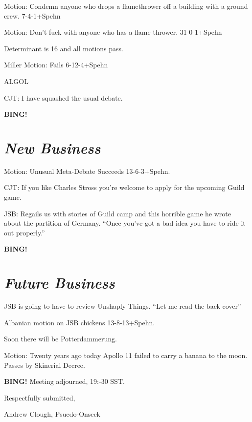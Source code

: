 \documentclass[10pt]{article}
\newcommand{\bing}{{\bf BING!} }
\newcommand{\goto}[1]{\bing \vskip 12pt \section*{{\em{#1}}}}
\begin{document}
Motion: Condemn anyone who drops a flamethrower off a building with a ground crew.  7-4-1+Spehn

Motion:  Don't fuck with anyone who has a flame thrower.  31-0-1+Spehn

Determinant is 16 and all motions pass.

Miller Motion: Fails  6-12-4+Spehn

ALGOL

CJT:  I have squashed the usual debate.

\goto{New Business}

Motion:  Unusual Meta-Debate  Succeeds 13-6-3+Spehn.

CJT:  If you like Charles Stross you're welcome to apply for the upcoming Guild game.

JSB:  Regails us with stories of Guild camp and this horrible game he wrote about the partition of Germany.  ``Once you've got a bad idea you have to ride it out properly.''

\goto{Future Business}

JSB is going to have to review Unshaply Things.  ``Let me read the back cover''

Albanian motion on JSB chickens 13-8-13+Spehn.

Soon there will be Potterdammerung.

Motion:  Twenty years ago today Apollo 11 failed to carry a banana to the moon.  Passes by Skinerial Decree.

\bing
\noindent
Meeting adjourned, 19:-30 SST.

\vspace{18pt}

\centerline{Respectfully submitted,}
\centerline{Andrew Clough, Psuedo-Onseck}
\end{document}
